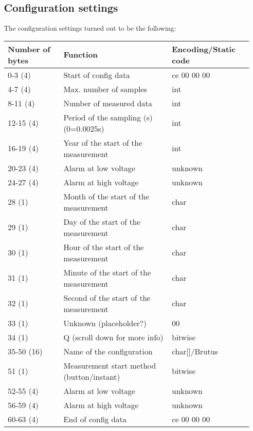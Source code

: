 \documentclass[a4paper,12pt]{article}
\begin{document}
\subsection{Configuration settings}
The configuration settings turned out to be the following:
\begin{table}[h!]
\centering
\begin{tabular}{|l|l|l|}
\hline
Number of bytes & Function & Encoding/Static code \\ \hline
0-3 (4) & Start of config data & ce 00 00 00 \\ \hline
4-7 (4) & Max. number of samples & int \\ \hline
8-11 (4) & Number of measured data & int \\ \hline
12-15 (4) & Period of the sampling (s) (0=0.0025s)  & int \\ \hline
16-19 (4) & Year of the start of the measurement & int \\ \hline
20-23 (4) & Alarm at low voltage & unknown \\ \hline
24-27 (4) & Alarm at high voltage & unknown \\ \hline
28 (1) & Month of the start of the measurement & char \\ \hline
29 (1) & Day of the start of the measurement & char \\ \hline
30 (1) & Hour of the start of the measurement & char \\ \hline
31 (1) & Minute of the start of the measurement & char \\ \hline
32 (1) & Second of the start of the measurement & char \\ \hline
33 (1) & Unknown (placeholder?) & 00 \\ \hline
34 (1) & Q (scroll down for more info) & bitwise \\ \hline
35-50 (16) & Name of the configuration & char[]/Brutus \\ \hline
51 (1) & Measurement start method (button/instant) & bitwise \\ \hline
52-55 (4) & Alarm at low voltage & unknown \\ \hline
56-59 (4) & Alarm at high voltage & unknown \\ \hline
60-63 (4) & End of config data & ce 00 00 00 \\ \hline
\end{tabular}
\end{table}
\end{document}
